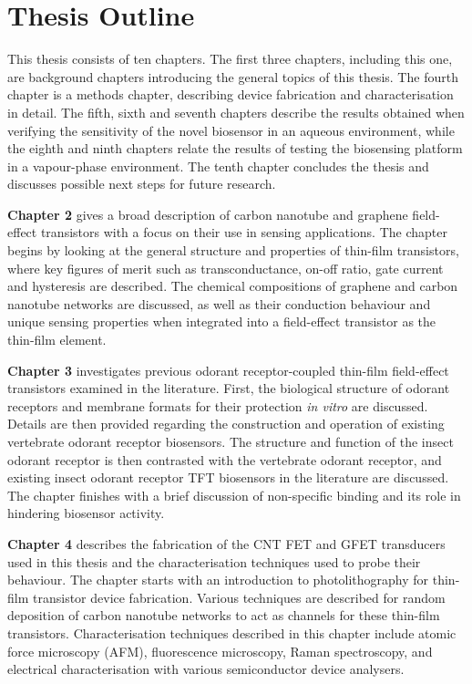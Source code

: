 \documentclass[
  a4paper,
]{scrbook}
\begin{document}
\hypertarget{thesis-outline}{%
\section{Thesis Outline}\label{thesis-outline}}

This thesis consists of ten chapters. The first three chapters,
including this one, are background chapters introducing the general
topics of this thesis. The fourth chapter is a methods chapter,
describing device fabrication and characterisation in detail. The fifth,
sixth and seventh chapters describe the results obtained when verifying
the sensitivity of the novel biosensor in an aqueous environment, while
the eighth and ninth chapters relate the results of testing the
biosensing platform in a vapour-phase environment. The tenth chapter
concludes the thesis and discusses possible next steps for future
research.

\textbf{Chapter 2} gives a broad description of carbon nanotube and
graphene field-effect transistors with a focus on their use in sensing
applications. The chapter begins by looking at the general structure and
properties of thin-film transistors, where key figures of merit such as
transconductance, on-off ratio, gate current and hysteresis are
described. The chemical compositions of graphene and carbon nanotube
networks are discussed, as well as their conduction behaviour and unique
sensing properties when integrated into a field-effect transistor as the
thin-film element.

\textbf{Chapter 3} investigates previous odorant receptor-coupled
thin-film field-effect transistors examined in the literature. First,
the biological structure of odorant receptors and membrane formats for
their protection \emph{in vitro} are discussed. Details are then
provided regarding the construction and operation of existing vertebrate
odorant receptor biosensors. The structure and function of the insect
odorant receptor is then contrasted with the vertebrate odorant
receptor, and existing insect odorant receptor TFT biosensors in the
literature are discussed. The chapter finishes with a brief discussion
of non-specific binding and its role in hindering biosensor activity.

\textbf{Chapter 4} describes the fabrication of the CNT FET and GFET
transducers used in this thesis and the characterisation techniques used
to probe their behaviour. The chapter starts with an introduction to
photolithography for thin-film transistor device fabrication. Various
techniques are described for random deposition of carbon nanotube
networks to act as channels for these thin-film transistors.
Characterisation techniques described in this chapter include atomic
force microscopy (AFM), fluorescence microscopy, Raman spectroscopy, and
electrical characterisation with various semiconductor device analysers.
\end{document}
